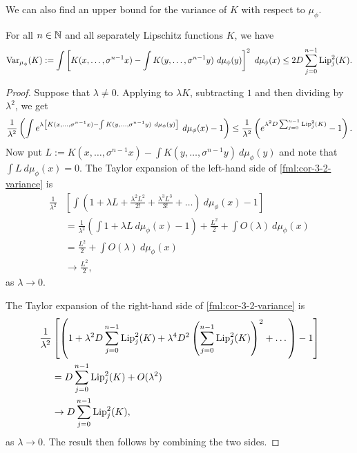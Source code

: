 We can also find an upper bound for the variance of $K$ with respect to $\mu_\phi$.

\begin{corollary} \label{cor:cm-3-2}
	For all $n \in \mathbb{N}$ and all separately Lipschitz functions $K$, we have
	\[
		\operatorname{Var}_{\mu_\phi}(K) := \int{\left[K(x, \dots, \sigma^{n - 1}{x}) - \int{K(y, \dots, \sigma^{n - 1}{y})\ d\mu_\phi(y)}\right]^2\ d\mu_\phi(x)} \leq 2D\sum_{j = 0}^{n - 1}{\operatorname{Lip}_j^2(K)}.
	\]
	
	\begin{proof}
		Suppose that $\lambda \neq 0$. Applying  to $\lambda K$, subtracting $1$ and then dividing by $\lambda^2$, we get
		\begin{equation} \label{fml:cor-3-2-variance}
			\frac{1}{\lambda^2}\left(\int{e^{\lambda\left[K(x, \dots, \sigma^{n - 1}{x}) - \int{K(y, \dots, \sigma^{n - 1}{y})\ d\mu_\phi(y)}\right]}\ d\mu_\phi(x)} - 1\right) \leq \frac{1}{\lambda^2}\left(e^{\lambda^2 D \sum_{j = 0}^{n - 1}{\Lip_j^2(K)}} - 1\right).
		\end{equation}
		Now put $L := K(x, \dots, \sigma^{n - 1}{x}) - \int{K(y, \dots, \sigma^{n - 1}{y})\ d\mu_\phi(y)}$ and note that $\int{L\ d\mu_\phi(x)} = 0$. The Taylor expansion of the left-hand side of \eqref{fml:cor-3-2-variance} is
		\begin{align*}
			\frac{1}{\lambda^2}&\left[\int{\left(1 + \lambda L + \frac{\lambda^2 L^2}{2!} + \frac{\lambda^3 L^3}{3!} + \dots\right)\ d\mu_\phi(x)} - 1\right] \\
				&= \frac{1}{\lambda^2}\left(\int{1 + \lambda L\ d\mu_\phi(x)} - 1\right) + \frac{L^2}{2} + \int{O(\lambda)\ d\mu_\phi(x)} \\
				&= \frac{L^2}{2} + \int{O(\lambda)\ d\mu_\phi(x)} \\
				&\to \frac{L^2}{2},
		\end{align*}
		as $\lambda \to 0$.
		
		The Taylor expansion of the right-hand side of \eqref{fml:cor-3-2-variance} is
		\begin{align*}
			\frac{1}{\lambda^2}&\left[\left(1 + \lambda^2 D \sum_{j = 0}^{n - 1}{\operatorname{Lip}_j^2(K)} + \lambda^4 D^2 \left(\sum_{j = 0}^{n - 1}{\operatorname{Lip}_j^2(K)} \right)^2 + \dots\right) - 1 \right] \\
				&= D \sum_{j = 0}^{n - 1}{\operatorname{Lip}_j^2(K)} + O(\lambda^2) \\
				&\to D \sum_{j = 0}^{n - 1}{\operatorname{Lip}_j^2(K)},
		\end{align*}
		as $\lambda \to 0$. The result then follows by combining the two sides.
	\end{proof}
\end{corollary}

